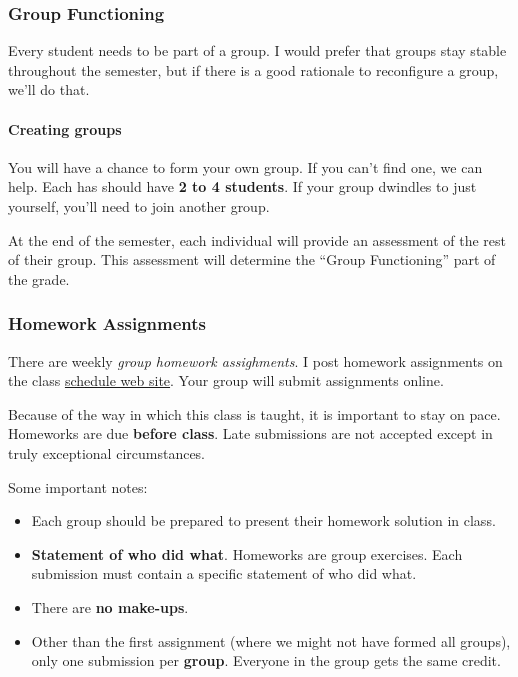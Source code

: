 \documentclass[11pt]{article}
\begin{document}
\subsubsection{Group Functioning}\label{group-functioning}

Every student needs to be part of a group. I would prefer that groups
stay stable throughout the semester, but if there is a good rationale to
reconfigure a group, we'll do that.



\paragraph{Creating groups} You will have a chance to form your own group.
If you can't find one, we can help. Each has should have \textbf{2 to 4 students}. If your group dwindles to just yourself, you'll need to join another group.

At the end of the semester, each individual will provide an assessment
of the rest of their group. This assessment will determine the ``Group Functioning'' part of the grade.

\subsubsection{Homework Assignments}\label{homework-assignments}

There are weekly \emph{group homework assighments}. I post homework
assignments on the class \href{./schedule.html}{schedule web site}. Your
group will submit assignments online.

Because of the way in which this class is taught, it is important to
stay on pace. Homeworks are due \textbf{before class}. Late submissions
are not accepted except in truly exceptional circumstances.

Some important notes:

\begin{itemize}
\item
Each group should be prepared to present their homework solution in
class.

\item
  \textbf{Statement of who did what}. Homeworks are group exercises.
  Each submission must contain a specific statement of who did what.
\item
  There are \textbf{no make-ups}.
\item
  Other than the first assignment (where we might not have formed all
  groups), only one submission per \textbf{\textbf{group}}. Everyone in
  the group gets the same credit.
\end{itemize}
\end{document}
